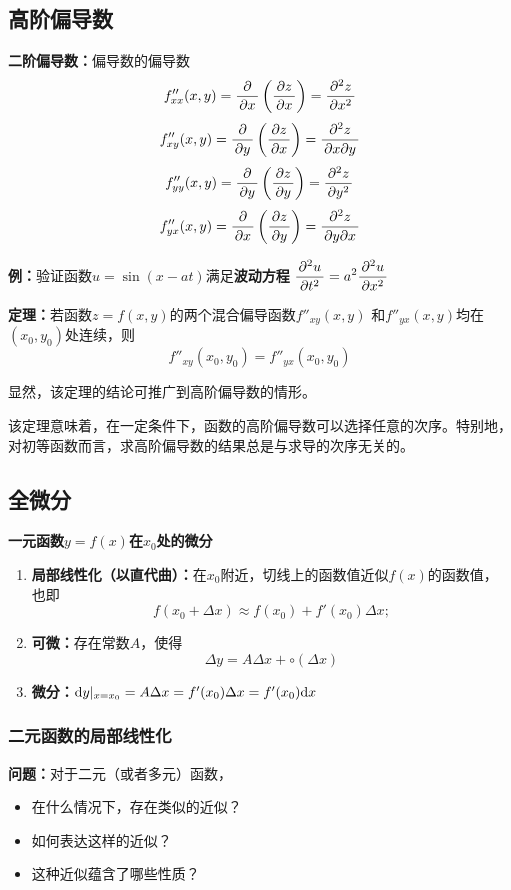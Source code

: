 \subsection{高阶偏导数}

{\bf 二阶偏导数：}偏导数的偏导数 
$${f''_{xx}(x,y)=\displaystyle\frac{\,{\partial}\,}{\,{\partial x}\,}\left(\displaystyle\frac{\,{\partial z}\,}{\,{\partial x}\,}\right)
=\displaystyle\frac{\,{\partial^2 z}\,}{\,{\partial x^2}\,}}$$ 
$${f''_{xy}(x,y)=\displaystyle\frac{\,{\partial}\,}{\,{\partial y}\,}\left(\displaystyle\frac{\,{\partial z}\,}{\,{\partial x}\,}\right)
=\displaystyle\frac{\,{\partial^2 z}\,}{\,{\partial x\partial y}\,}}$$ 
$${f''_{yy}(x,y)=\displaystyle\frac{\,{\partial}\,}{\,{\partial y}\,}\left(\displaystyle\frac{\,{\partial z}\,}{\,{\partial y}\,}\right)
=\displaystyle\frac{\,{\partial^2 z}\,}{\,{\partial y^2}\,}}$$ 
$${f''_{yx}(x,y)=\displaystyle\frac{\,{\partial}\,}{\,{\partial x}\,}\left(\displaystyle\frac{\,{\partial z}\,}{\,{\partial y}\,}\right)
=\displaystyle\frac{\,{\partial^2 z}\,}{\,{\partial y\partial x}\,}}$$

{\bf 例：}验证函数$u=\sin(x-at)$满足{\bf 波动方程}
$\displaystyle\frac{\,{\partial^2u}\,}{\,{\partial t^2}\,}=a^2\displaystyle\frac{\,{\partial^2u}\,}{\,{\partial x^2}\,}$

\begin{thx}
	{\bf 定理：}若函数$z=f(x,y)$的两个混合偏导函数$f''_{xy}(x,y)$
	和$f''_{yx}(x,y)$均在$(x_0,y_0)$处连续，则
	$$f''_{xy}(x_0,y_0)=f''_{yx}(x_0,y_0)$$
\end{thx}

显然，该定理的结论可推广到高阶偏导数的情形。

该定理意味着，在一定条件下，函数的高阶偏导数可以选择任意的次序。特别地，
对初等函数而言，求高阶偏导数的结果总是与求导的次序无关的。

\subsection{全微分}

\begin{shaded}
	{\bf 一元函数$y=f(x)$在$x_0$处的微分}
	
	\begin{enumerate}[(1)]
  	  \setlength{\itemindent}{1cm}
  	  \item {\bf 局部线性化（以直代曲）：}在$x_0$附近，切线上的函数值近似$f(x)$的函数值，
  	  也即
  	  $$f(x_0+\Delta x)\approx f(x_0)+f'(x_0)\Delta x;$$
	  \item {\bf 可微：}存在常数$A$，使得
	  $$\Delta y=A\Delta x+\circ(\Delta x)$$
	  \item {\bf 微分：}$\mathrm{d} y|_{x=x_0}=A\Delta x=f'(x_0)\Delta x=f'(x_0)\mathrm{d} x$
	\end{enumerate}
\end{shaded}

\subsubsection{二元函数的局部线性化}

{\bf 问题：}对于二元（或者多元）函数， 
\begin{itemize}
  \item 在什么情况下，存在类似的近似？
  \item 如何表达这样的近似？ 
  \item 这种近似蕴含了哪些性质？
\end{itemize}

